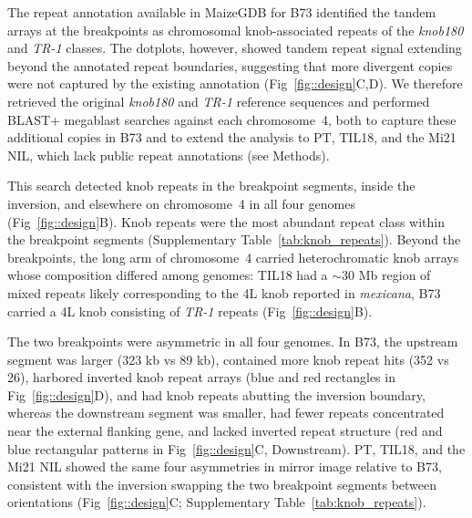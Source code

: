 \documentclass[9pt,twocolumn,twoside]{rilabRxiv}
\newcommand{\mex}{\textit{mexicana}\xspace}
\begin{document}
The repeat annotation available in MaizeGDB \citep{Woodhouse2025-za} for B73 identified the tandem arrays at the breakpoints as chromosomal knob-associated repeats of the \textit{knob180} and \textit{TR-1} classes.
The dotplots, however, showed tandem repeat signal extending beyond the annotated repeat boundaries, suggesting that more divergent copies were not captured by the existing annotation (Fig~\ref{fig::design}C,D).
We therefore retrieved the original \textit{knob180} \citep{dennis1984} and \textit{TR-1} \citep{hsu2003} reference sequences and performed BLAST+ \citep{camacho2009} megablast searches against each chromosome~4, both to capture these additional copies in B73 and to extend the analysis to PT, TIL18, and the Mi21 NIL, which lack public repeat annotations (see Methods).

This search detected knob repeats in the breakpoint segments, inside the inversion, and elsewhere on chromosome~4 in all four genomes (Fig~\ref{fig::design}B).
Knob repeats were the most abundant repeat class within the breakpoint segments (Supplementary Table~\ref{tab:knob_repeats}).
Beyond the breakpoints, the long arm of chromosome~4 carried heterochromatic knob arrays whose composition differed among genomes: TIL18 had a $\sim$30 Mb region of mixed repeats likely corresponding to the 4L knob reported in \mex \citep{bilinski2018,albert2010}, B73 carried a 4L knob consisting of \textit{TR-1} repeats \cite{ghaffari2013,albert2010}(Fig~\ref{fig::design}B).

The two breakpoints were asymmetric in all four genomes.
In B73, the upstream segment was larger (323 kb vs 89 kb), contained more knob repeat hits (352 vs 26), harbored inverted knob repeat arrays (blue and red rectangles in Fig~\ref{fig::design}D), and had knob repeats abutting the inversion boundary, whereas the downstream segment was smaller, had fewer repeats concentrated near the external flanking gene, and lacked inverted repeat structure (red and blue rectangular patterns in Fig~\ref{fig::design}C, Downstream).
PT, TIL18, and the Mi21 NIL showed the same four asymmetries in mirror image relative to B73, consistent with the inversion swapping the two breakpoint segments between orientations (Fig~\ref{fig::design}C; Supplementary Table~\ref{tab:knob_repeats}).
\end{document}
